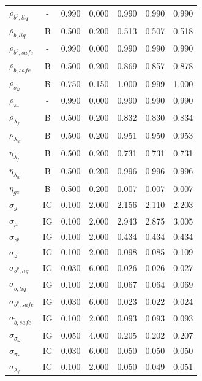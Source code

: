 \documentclass[12pt]{article}
\begin{document}
{\begin{longtable}{lcccccc}
$\rho_{b^p,liq}$ & - &    0.990 &    0.000 &    0.990 &    0.990 &    0.990 \\
$\rho_{\tilde{b},liq}$ & B &    0.500 &    0.200 &    0.513 &    0.507 &    0.518 \\
$\rho_{b^p,safe}$ & - &    0.990 &    0.000 &    0.990 &    0.990 &    0.990 \\
$\rho_{\tilde{b},safe}$ & B &    0.500 &    0.200 &    0.869 &    0.857 &    0.878 \\
$\rho_{\sigma_\omega}$ & B &    0.750 &    0.150 &    1.000 &    0.999 &    1.000 \\
$\rho_{\pi_*}$ & - &    0.990 &    0.000 &    0.990 &    0.990 &    0.990 \\
$\rho_{\lambda_f}$ & B &    0.500 &    0.200 &    0.832 &    0.830 &    0.834 \\
$\rho_{\lambda_w}$ & B &    0.500 &    0.200 &    0.951 &    0.950 &    0.953 \\
$\eta_{\lambda_f}$ & B &    0.500 &    0.200 &    0.731 &    0.731 &    0.731 \\
$\eta_{\lambda_w}$ & B &    0.500 &    0.200 &    0.996 &    0.996 &    0.996 \\
$\eta_{gz}$ & B &    0.500 &    0.200 &    0.007 &    0.007 &    0.007 \\
$\sigma_{g}$ & IG &    0.100 &    2.000 &    2.156 &    2.110 &    2.203 \\
$\sigma_{\mu}$ & IG &    0.100 &    2.000 &    2.943 &    2.875 &    3.005 \\
$\sigma_{z^p}$ & IG &    0.100 &    2.000 &    0.434 &    0.434 &    0.434 \\
$\sigma_{z}$ & IG &    0.100 &    2.000 &    0.098 &    0.085 &    0.109 \\
$\sigma_{b^p, liq}$ & IG &    0.030 &    6.000 &    0.026 &    0.026 &    0.027 \\
$\sigma_{\tilde{b}, liq}$ & IG &    0.100 &    2.000 &    0.067 &    0.064 &    0.069 \\
$\sigma_{b^p, safe}$ & IG &    0.030 &    6.000 &    0.023 &    0.022 &    0.024 \\
$\sigma_{\tilde{b}, safe}$ & IG &    0.100 &    2.000 &    0.093 &    0.093 &    0.093 \\
$\sigma_{\sigma_\omega}$ & IG &    0.050 &    4.000 &    0.205 &    0.202 &    0.207 \\
$\sigma_{\pi_*}$ & IG &    0.030 &    6.000 &    0.050 &    0.050 &    0.050 \\
$\sigma_{\lambda_f}$ & IG &    0.100 &    2.000 &    0.050 &    0.049 &    0.051 \\

\end{longtable}}
\end{document}
